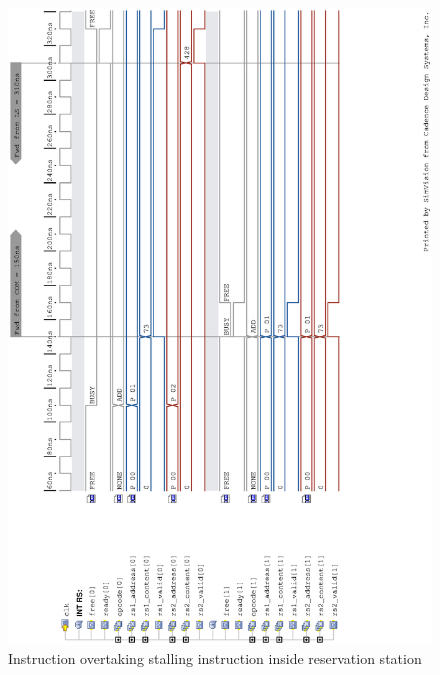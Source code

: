 \documentclass[12pt,a4paper]{article} %
\begin{document}
\begin{figure}[!p]
	\centering
	\includegraphics[width=\textwidth, trim = {1.5cm 1.5cm 1.5cm 1.5cm}]{Source/Waveforms/outOfOrder.eps}
	\caption{Instruction overtaking stalling instruction inside reservation station} 
	\label{fig-ooo}
\end{figure}


\newpage
\end{document}
